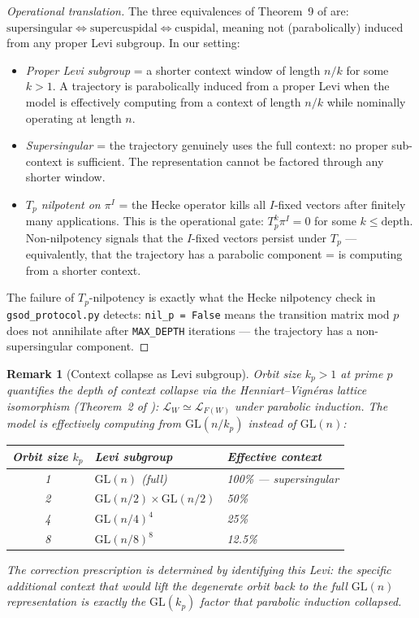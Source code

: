 \documentclass[11pt,a4paper]{article}
\newtheorem{remark}[theorem]{Remark}
\begin{document}
\begin{proof}[Operational translation]
The three equivalences of Theorem~9 of \cite{HV17} are:
$\text{supersingular} \iff \text{supercuspidal} \iff \text{cuspidal}$,
meaning not (parabolically) induced from any proper Levi subgroup.
In our setting:
\begin{itemize}
  \item \emph{Proper Levi subgroup} = a shorter context window of
        length $n/k$ for some $k > 1$. A trajectory is
        parabolically induced from a proper Levi when the model
        is effectively computing from a context of length $n/k$
        while nominally operating at length $n$.
  \item \emph{Supersingular} = the trajectory genuinely uses
        the full context: no proper sub-context is sufficient.
        The representation cannot be factored through any
        shorter window.
  \item \emph{$T_p$ nilpotent on $\pi^I$} = the Hecke operator
        kills all $I$-fixed vectors after finitely many applications.
        This is the operational gate: $T_p^k \pi^I = 0$ for some
        $k \leq \mathrm{depth}$.
        Non-nilpotency signals that the $I$-fixed vectors persist
        under $T_p$ --- equivalently, that the trajectory has a
        parabolic component = is computing from a shorter context.
\end{itemize}
The failure of $T_p$-nilpotency is exactly what the Hecke nilpotency
check in \texttt{gsod\_protocol.py} detects: \texttt{nil\_p = False}
means the transition matrix mod $p$ does not annihilate after
\texttt{MAX\_DEPTH} iterations --- the trajectory has a
non-supersingular component.
\end{proof}

\begin{remark}[Context collapse as Levi subgroup]
Orbit size $k_p > 1$ at prime $p$ quantifies the depth of context
collapse via the Henniart--Vign\'{e}ras lattice isomorphism
(Theorem~2 of \cite{HV17}): $\mathcal{L}_W \simeq \mathcal{L}_{F(W)}$
under parabolic induction.
The model is effectively computing from $\mathrm{GL}(n/k_p)$
instead of $\mathrm{GL}(n)$:
\begin{center}
\renewcommand{\arraystretch}{1.3}\small
\begin{tabular}{cll}
\toprule
Orbit size $k_p$ & Levi subgroup & Effective context \\
\midrule
1 & $\mathrm{GL}(n)$ (full) & 100\% --- supersingular \\
2 & $\mathrm{GL}(n/2) \times \mathrm{GL}(n/2)$ & 50\% \\
4 & $\mathrm{GL}(n/4)^4$ & 25\% \\
8 & $\mathrm{GL}(n/8)^8$ & 12.5\% \\
\bottomrule
\end{tabular}
\end{center}
The correction prescription is determined by identifying this Levi:
the specific additional context that would lift the degenerate
orbit back to the full $\mathrm{GL}(n)$ representation is exactly
the $\mathrm{GL}(k_p)$ factor that parabolic induction collapsed.
\end{remark}
\end{document}
